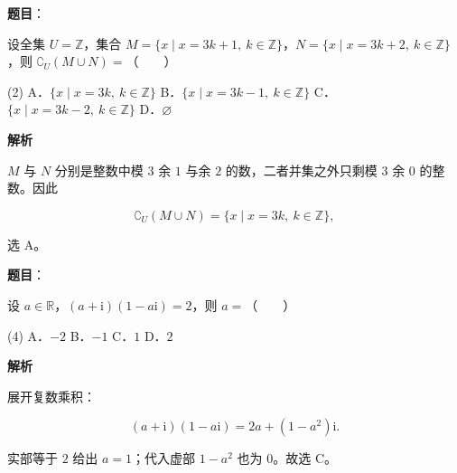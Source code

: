 \par\medskip


\begin{answer}

\textbf{题目}：

设全集 $U=\mathbb Z$，集合 $M=\{x\mid x=3k+1,\ k\in\mathbb Z\}$，$N=\{x\mid x=3k+2,\ k\in\mathbb Z\}$，则 $\complement_U(M\cup N)=$\mbox{（　　）}

\begin{gkopts}(2)
\task A．$\{x\mid x=3k,\ k\in\mathbb Z\}$
\task B．$\{x\mid x=3k-1,\ k\in\mathbb Z\}$
\task C．$\{x\mid x=3k-2,\ k\in\mathbb Z\}$
\task D．$\varnothing$
\end{gkopts}

\textbf{解析}

$M$ 与 $N$ 分别是整数中模 $3$ 余 $1$ 与余 $2$ 的数，二者并集之外只剩模 $3$ 余 $0$ 的整数。因此

\nopagebreak[4]
\[
\complement_U(M\cup N)=\{x\mid x=3k,\ k\in\mathbb Z\},
\]

选 A。


\end{answer}
\begin{answer}

\textbf{题目}：

设 $a\in\mathbb R$，$(a+\mathrm i)(1-a\mathrm i)=2$，则 $a=$\mbox{（　　）}

\begin{gkopts}(4)
\task A．$-2$
\task B．$-1$
\task C．$1$
\task D．$2$
\end{gkopts}

\textbf{解析}

展开复数乘积：

\nopagebreak[4]
\[
(a+\mathrm i)(1-a\mathrm i)=2a+(1-a^2)\mathrm i.
\]

实部等于 $2$ 给出 $a=1$；代入虚部 $1-a^2$ 也为 $0$。故选 C。


\end{answer}
